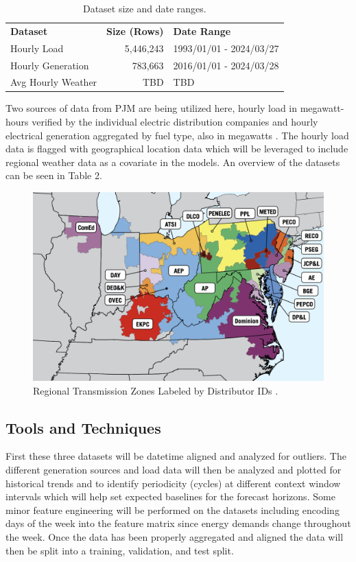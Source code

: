 \documentclass[sigconf]{acmart}
\begin{document}
  \begin{table}[hbt!]
\centering
\caption{Dataset size and date ranges.}
\begin{tabular}{lrl}
\toprule
\textbf{Dataset} & \hfil \textbf{Size (Rows)} & \textbf{Date Range} \\
\cmidrule(rl){1-1}\cmidrule(rl){2-2}\cmidrule(rl){3-3}
  Hourly Load & 5,446,243 & 1993/01/01 - 2024/03/27 \\
  Hourly Generation & 783,663 & 2016/01/01 - 2024/03/28 \\   
  Avg Hourly Weather & TBD & TBD  \\   
  \bottomrule
\end{tabular}
\end{table}
  
  Two sources of data from PJM are being utilized here, hourly load in megawatt-hours verified by the individual electric distribution companies and hourly electrical generation aggregated by fuel type, also in megawatts \cite{PJMLoad24}. The hourly load data is flagged with geographical location data which will be leveraged to include regional weather data as a covariate in the models. An overview of the datasets can be seen in Table 2.
  
  \begin{figure}
    \includegraphics[width=\columnwidth]{Images/Zones.png}
    \caption{Regional Transmission Zones Labeled by Distributor IDs \protect \cite{PJM24}.}
    \Description{}
    \label{fig:zone}
  \end{figure}

  \subsection{Tools and Techniques}
  First these three datasets will be datetime aligned and analyzed for outliers. The different generation sources and load data will then be analyzed and plotted for historical trends and to identify periodicity (cycles) at different context window intervals which will help set expected baselines for the forecast horizons. Some minor feature engineering will be performed on the datasets including encoding days of the week into the feature matrix since energy demands change throughout the week. Once the data has been properly aggregated and aligned the data will then be split into a training, validation, and test split.
\end{document}
